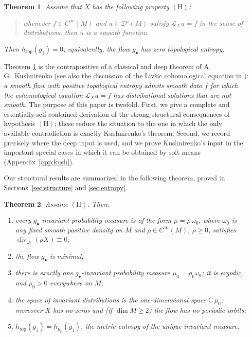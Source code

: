 \documentclass[11pt]{amsart}
\theoremstyle{plain}
\newtheorem{theorem}{Theorem}[section]
\theoremstyle{definition}
\theoremstyle{remark}
\newcommand{\Dp}{\mathcal{D}'}
\newcommand{\C}{\mathbb{C}}
\newcommand{\Lx}{\mathcal{L}_X}
\begin{document}
\begin{theorem}\label{thm:main}
Assume that $X$ has the following property $(\mathrm{H})$:
\begin{quote}\itshape
whenever $f\in C^\infty(M)$ and $u\in\Dp(M)$ satisfy
$\Lx u=f$ in the sense of distributions, then $u$ is a smooth function.
\end{quote}
Then $h_{\mathrm{top}}(g_1)=0$; equivalently, the flow $g_\bullet$ has zero
topological entropy.
\end{theorem}

Theorem \ref{thm:main} is the contrapositive of a classical and deep
theorem of A.\,G.~Kushnirenko \cite{Kus} (see also the discussion of the
Liv\v{s}ic cohomological equation in \cite{dlLMM}): \emph{a smooth flow
with positive topological entropy admits smooth data $f$ for which the
cohomological equation $\Lx u=f$ has distributional solutions that are
not smooth.} The purpose of this paper is twofold. First, we give a
complete and essentially self-contained derivation of the strong
structural consequences of hypothesis $(\mathrm{H})$; these reduce the
situation to the one in which the only available contradiction is
exactly Kushnirenko's theorem. Second, we record precisely where the
deep input is used, and we prove Kushnirenko's input in the important
special cases in which it can be obtained by soft means
(Appendix~\ref{app:kush}).

Our structural results are summarized in the following theorem, proved
in Sections~\ref{sec:structure} and \ref{sec:entropy}.

\begin{theorem}\label{thm:structure}
Assume $(\mathrm{H})$. Then:
\begin{enumerate}
\item[(a)] every $g_\bullet$-invariant probability measure is of the form
$\mu=\rho\,\omega_0$, where $\omega_0$ is any fixed smooth positive
density on $M$ and $\rho\in C^\infty(M)$, $\rho\ge 0$, satisfies
$\operatorname{div}_{\omega_0}(\rho X)\equiv 0$;
\item[(b)] the flow $g_\bullet$ is minimal;
\item[(c)] there is exactly one $g_\bullet$-invariant probability measure
$\mu_0=\rho_0\omega_0$; it is ergodic, and $\rho_0>0$ everywhere on $M$;
\item[(d)] the space of invariant distributions is the one-dimensional
space $\C\,\mu_0$; moreover $X$ has no zeros and (if $\dim M\ge 2$) the
flow has no periodic orbits;
\item[(e)] $h_{\mathrm{top}}(g_1)=h_{\mu_0}(g_1)$, the metric entropy of
the unique invariant measure.
\end{enumerate}
\end{theorem}
\end{document}
